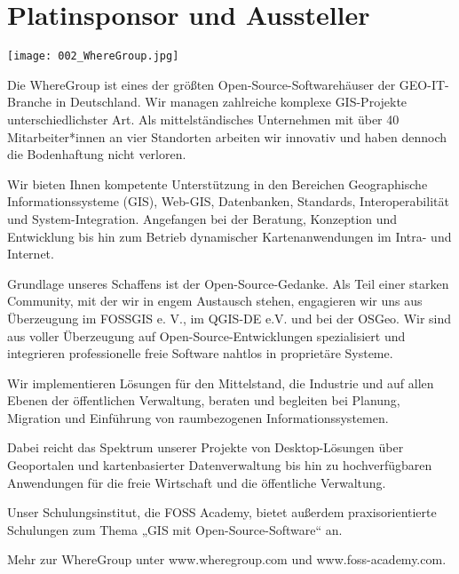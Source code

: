 \section*{Platinsponsor und Aussteller}

\vspace{-0.2cm}
\centerline{\texttt{[image: 002\_WhereGroup.jpg]}}
\noindent
Die WhereGroup ist eines der größten Open-Source-Software\-häuser der GEO-IT-Branche in Deutschland. Wir managen zahlreiche komplexe GIS-Projekte unterschiedlichster Art. Als mittelständisches Unternehmen mit über 40 Mitarbeiter*innen an vier Standorten arbeiten wir innovativ und haben dennoch die Bodenhaftung nicht verloren.

Wir bieten Ihnen kompetente Unterstützung in den Bereichen Geographische Informationssysteme (GIS), Web-GIS, Datenbanken, Standards, Interoperabilität und System-Integration. Angefangen bei der Beratung, Konzeption und Entwicklung bis hin zum Betrieb dynamischer Kartenanwendungen im Intra- und Internet.

Grundlage unseres Schaffens ist der Open-Source-Gedanke. Als Teil einer starken Community, mit der wir in engem Austausch stehen, engagieren wir uns aus Überzeugung im FOSSGIS e. V., im QGIS-DE e.V. und bei der OSGeo. Wir sind aus voller Überzeugung auf Open-Source-Entwicklungen spezialisiert und integrieren professionelle freie Software nahtlos in proprietäre Systeme.

Wir implementieren Lösungen für den Mittelstand, die Industrie und auf allen Ebenen der öffentlichen Verwaltung, beraten und begleiten bei Planung, Migration und Einführung von raumbezogenen Informationssystemen.

Dabei reicht das Spektrum unserer Projekte von Desktop-Lösungen über Geoportalen und kartenbasierter Datenverwaltung bis hin zu hochverfügbaren Anwendungen für die freie Wirtschaft und die öffentliche Verwaltung.

Unser Schulungsinstitut, die FOSS Academy, bietet außerdem praxisorientierte Schulungen zum Thema „GIS mit Open-Source-Software“ an.

Mehr zur WhereGroup unter www.wheregroup.com und www.foss-academy.com.
\normalsize
